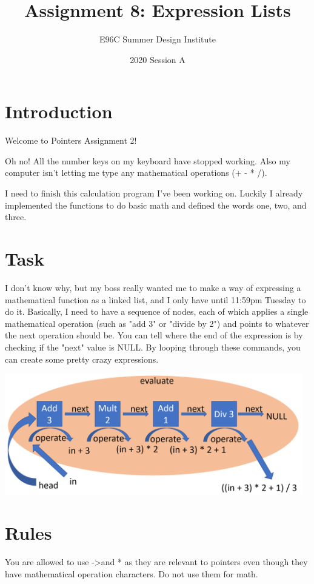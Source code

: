 \documentclass[12pt]{article}
\title{Assignment 8: Expression Lists}
\author{E96C Summer Design Institute}
\date{2020 Session A}
\begin{document}
\maketitle

\section{Introduction}
Welcome to Pointers Assignment 2!

Oh no! All the number keys on my keyboard have stopped working. Also my computer isn't letting me type any mathematical operations (+ - * /).

I need to finish this calculation program I've been working on. Luckily I already implemented the functions to do basic math and defined the words one, two, and three.


\section{Task}
I don't know why, but my boss really wanted me to make a way of expressing a mathematical function as a linked list, and I only have until 11:59pm Tuesday to do it. Basically, I need to have a sequence of nodes, each of which applies a single mathematical operation (such as "add 3" or "divide by 2") and points to whatever the next operation should be. You can tell where the end of the expression is by checking if the "next" value is NULL. By looping through these commands, you can create some pretty crazy expressions.

\begin{center}
\includegraphics[width=13cm]{images/betterDiagram.png}
\end{center}

\section{Rules}

You are allowed to use -\textgreater  and * as they are relevant to pointers even though they have mathematical operation characters. Do not use them for math.
\end{document}
